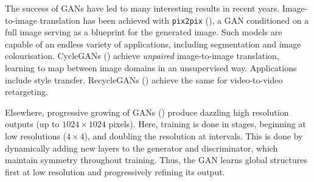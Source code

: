 The success of GANs have led to many interesting results in recent years. Image-to-image translation has been achieved with \texttt{pix2pix} (\cite{isola2017image}), a GAN conditioned on a full image serving as a blueprint for the generated image. Such models are capable of an endless variety of applications, including segmentation and image colourisation. CycleGANs (\cite{zhu2017unpaired}) achieve \emph{unpaired} image-to-image translation, learning to map between image domains in an unsupervised way. Applications include style transfer. RecycleGANs (\cite{bansal2018recycle}) achieve the same for video-to-video retargeting.

Elsewhere, progressive growing of GANs (\cite{karras2017progressive}) produce dazzling high resolution outputs (up to $1024\times1024$ pixels). Here, training is done in stages, beginning at low resolutions ($4\times4$), and doubling the resolution at intervals. This is done by dynamically adding new layers to the generator and discriminator, which maintain symmetry throughout training. Thus, the GAN learns global structures first at low resolution and progressively refining its output.
